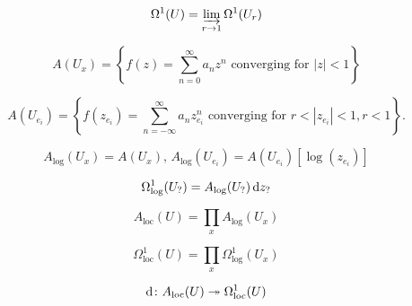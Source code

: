 \begin{frame}

\begin{equation*}
\Omega^1 (U) = \varinjlim_{r\to 1} \Omega^1(U_r)
\end{equation*}


\begin{equation*}
A(U_x) = \left\{ f(z) = \sum_{n=0}^\infty a_n z^n \text{ converging for } |z| \lt 1\right\}
\end{equation*}

\begin{equation*}
A(U_{e_i}) = \left\{ f(z_{e_i}) = \sum_{n=-\infty}^\infty a_n z_{e_i}^n \text{ converging for } r \lt |z_{e_i}| \lt 1, r \lt 1\right\}\text{.}
\end{equation*}

\begin{equation*}
A_{\log}(U_x) = A(U_x),\,A_{\log}(U_{e_i}) = A(U_{e_i})[\log (z_{e_i})]
\end{equation*}

\begin{equation*}
\Omega_{\log}^1(U_?) = A_{\log}(U_?) \mathop{}\!\mathrm{d} z_?
\end{equation*}

\begin{equation*}
A_{\operatorname{loc}}(U) = \prod_x A_{\log}(U_x)
\end{equation*}

\begin{equation*}
\Omega^1_{\operatorname{loc}}(U) = \prod_x \Omega^1_{\log}(U_x)
\end{equation*}

\begin{equation*}
\mathop{}\!\mathrm{d} \colon A_{\operatorname{loc}}(U) \twoheadrightarrow \Omega^1_{\operatorname{loc}}(U)
\end{equation*}
\end{frame}


